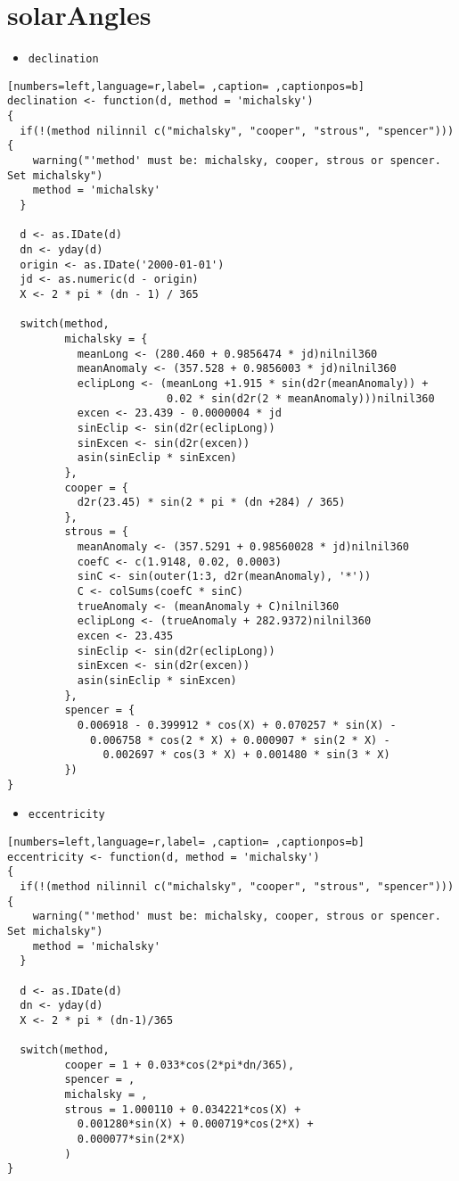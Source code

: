 \section{solarAngles}
\label{sec:org2aeea58}
\begin{itemize}
\item \texttt{declination}
\end{itemize}
\begin{lstlisting}[numbers=left,language=r,label= ,caption= ,captionpos=b]
declination <- function(d, method = 'michalsky')
{
  if(!(method nilinnil c("michalsky", "cooper", "strous", "spencer"))){
    warning("'method' must be: michalsky, cooper, strous or spencer.
Set michalsky")
    method = 'michalsky'
  }

  d <- as.IDate(d)
  dn <- yday(d)
  origin <- as.IDate('2000-01-01')
  jd <- as.numeric(d - origin)
  X <- 2 * pi * (dn - 1) / 365

  switch(method,
         michalsky = {
           meanLong <- (280.460 + 0.9856474 * jd)nilnil360
           meanAnomaly <- (357.528 + 0.9856003 * jd)nilnil360
           eclipLong <- (meanLong +1.915 * sin(d2r(meanAnomaly)) +
                         0.02 * sin(d2r(2 * meanAnomaly)))nilnil360
           excen <- 23.439 - 0.0000004 * jd
           sinEclip <- sin(d2r(eclipLong))
           sinExcen <- sin(d2r(excen))
           asin(sinEclip * sinExcen)
         },
         cooper = {
           d2r(23.45) * sin(2 * pi * (dn +284) / 365)
         },
         strous = {
           meanAnomaly <- (357.5291 + 0.98560028 * jd)nilnil360
           coefC <- c(1.9148, 0.02, 0.0003)
           sinC <- sin(outer(1:3, d2r(meanAnomaly), '*'))
           C <- colSums(coefC * sinC)
           trueAnomaly <- (meanAnomaly + C)nilnil360
           eclipLong <- (trueAnomaly + 282.9372)nilnil360
           excen <- 23.435
           sinEclip <- sin(d2r(eclipLong))
           sinExcen <- sin(d2r(excen))
           asin(sinEclip * sinExcen)
         },
         spencer = {
           0.006918 - 0.399912 * cos(X) + 0.070257 * sin(X) -
             0.006758 * cos(2 * X) + 0.000907 * sin(2 * X) -
               0.002697 * cos(3 * X) + 0.001480 * sin(3 * X)           
         })
}
\end{lstlisting}
\begin{itemize}
\item \texttt{eccentricity}
\end{itemize}
\begin{lstlisting}[numbers=left,language=r,label= ,caption= ,captionpos=b]
eccentricity <- function(d, method = 'michalsky')
{
  if(!(method nilinnil c("michalsky", "cooper", "strous", "spencer"))){
    warning("'method' must be: michalsky, cooper, strous or spencer. Set michalsky")
    method = 'michalsky'
  }

  d <- as.IDate(d)
  dn <- yday(d)
  X <- 2 * pi * (dn-1)/365

  switch(method,
         cooper = 1 + 0.033*cos(2*pi*dn/365),
         spencer = , 
         michalsky = , 
         strous = 1.000110 + 0.034221*cos(X) +
           0.001280*sin(X) + 0.000719*cos(2*X) +
           0.000077*sin(2*X)
         )
}
\end{lstlisting}
